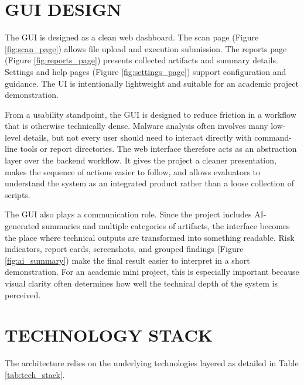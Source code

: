 \documentclass[a4paper,12pt,oneside]{report}
\begin{document}
\section{GUI DESIGN}
The GUI is designed as a clean web dashboard. The scan page (Figure \ref{fig:scan_page}) allows file upload and execution submission. The reports page (Figure \ref{fig:reports_page}) presents collected artifacts and summary details. Settings and help pages (Figure \ref{fig:settings_page}) support configuration and guidance. The UI is intentionally lightweight and suitable for an academic project demonstration.

\par

\par

From a usability standpoint, the GUI is designed to reduce friction in a workflow that is otherwise technically dense. Malware analysis often involves many low-level details, but not every user should need to interact directly with command-line tools or report directories. The web interface therefore acts as an abstraction layer over the backend workflow. It gives the project a cleaner presentation, makes the sequence of actions easier to follow, and allows evaluators to understand the system as an integrated product rather than a loose collection of scripts.

\par

\par

The GUI also plays a communication role. Since the project includes AI-generated summaries and multiple categories of artifacts, the interface becomes the place where technical outputs are transformed into something readable. Risk indicators, report cards, screenshots, and grouped findings (Figure \ref{fig:ai_summary}) make the final result easier to interpret in a short demonstration. For an academic mini project, this is especially important because visual clarity often determines how well the technical depth of the system is perceived.
\section{TECHNOLOGY STACK}
The architecture relies on the underlying technologies layered as detailed in Table \ref{tab:tech_stack}.
\end{document}
